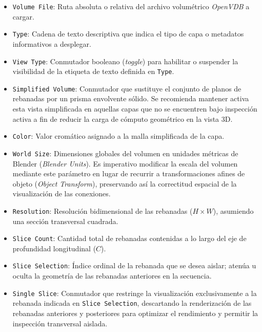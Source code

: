 \begin{itemize}
    \item \texttt{Volume File}: Ruta absoluta o relativa del archivo volumétrico \textit{OpenVDB} a cargar.
    \item \texttt{Type}: Cadena de texto descriptiva que indica el tipo de capa o metadatos informativos a desplegar.
    \item \texttt{View Type}: Conmutador booleano (\textit{toggle}) para habilitar o suspender la visibilidad de la etiqueta de texto definida en \texttt{Type}.
    \item \texttt{Simplified Volume}: Conmutador que sustituye el conjunto de planos de rebanadas por un prisma envolvente sólido. Se recomienda 
    mantener activa esta vista simplificada en aquellas capas que no se encuentren bajo inspección activa a fin de reducir la carga de cómputo geométrico en la vista 3D.
    \item \texttt{Color}: Valor cromático asignado a la malla simplificada de la capa.
    \item \texttt{World Size}: Dimensiones globales del volumen en unidades métricas de Blender (\textit{Blender Units}). Es imperativo modificar 
    la escala del volumen mediante este parámetro en lugar de recurrir a transformaciones afines de objeto (\textit{Object Transform}), preservando 
    así la correctitud espacial de la visualización de las conexiones.
    \item \texttt{Resolution}: Resolución bidimensional de las rebanadas ($H \times W$), asumiendo una sección transversal cuadrada.
    \item \texttt{Slice Count}: Cantidad total de rebanadas contenidas a lo largo del eje de profundidad longitudinal ($C$).
    \item \texttt{Slice Selection}: Índice ordinal de la rebanada que se desea aislar; atenúa u oculta la geometría de las rebanadas anteriores en la secuencia.
    \item \texttt{Single Slice}: Conmutador que restringe la visualización exclusivamente a la rebanada indicada en \texttt{Slice Selection}, descartando la 
    renderización de las rebanadas anteriores y posteriores para optimizar el rendimiento y permitir la inspección transversal aislada.
\end{itemize}


